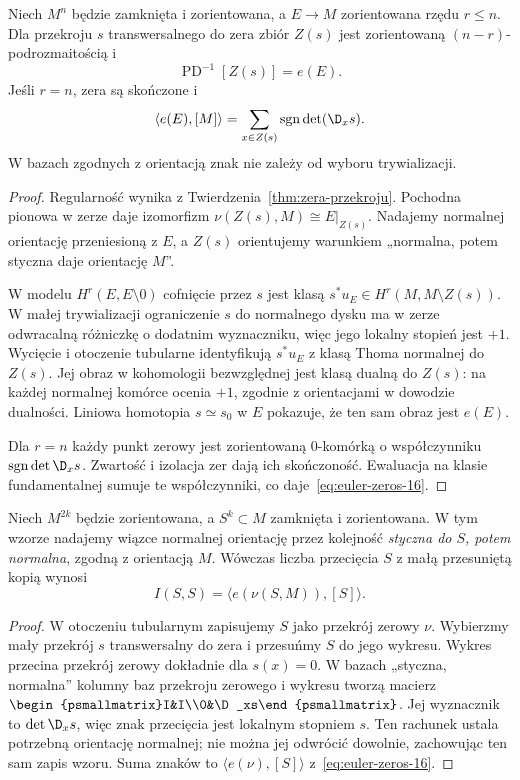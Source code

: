 \begin{twierdzenie}
\label{thm:euler-zeros-16}
Niech $M^n$ będzie
zamknięta i zorientowana,
a $E\to M$ zorientowana
rzędu $r\leq n$.
Dla przekroju $s$
transwersalnego do zera
zbiór $Z(s)$ jest
zorientowaną
$(n-r)$-podrozmaitością i
\[
 \operatorname{PD}^{-1}[Z(s)]=e(E).
\]
Jeśli $r=n$, zera są
skończone i
\begin{equation}\label{eq:euler-zeros-16}
 \langle e(E),[M]\rangle
   =\sum_{x\in Z(s)}
       \operatorname{sgn}\det(\D_xs).
\end{equation}
W bazach zgodnych z
orientacją znak nie
zależy od wyboru
trywializacji.
\end{twierdzenie}
\begin{proof}
Regularność wynika z Twierdzenia~\ref{thm:zera-przekroju}.
Pochodna pionowa w zerze daje izomorfizm
$\nu(Z(s),M)\cong E|_{Z(s)}$. Nadajemy normalnej
orientację przeniesioną z $E$, a $Z(s)$ orientujemy
warunkiem „normalna, potem styczna daje orientację $M$”.

W modelu $H^r(E,E\setminus0)$ cofnięcie przez $s$
jest klasą $s^*u_E\in H^r(M,M\setminus Z(s))$.
W małej trywializacji ograniczenie $s$ do normalnego
dysku ma w zerze odwracalną różniczkę o dodatnim
wyznaczniku, więc jego lokalny stopień jest $+1$.
Wycięcie i otoczenie tubularne identyfikują
$s^*u_E$ z klasą Thoma normalnej do $Z(s)$.
Jej obraz w kohomologii bezwzględnej jest klasą
dualną do $Z(s)$: na każdej normalnej komórce
ocenia $+1$, zgodnie z orientacjami w dowodzie dualności.
Liniowa homotopia $s\simeq s_0$ w $E$ pokazuje,
że ten sam obraz jest $e(E)$.

Dla $r=n$ każdy punkt zerowy jest zorientowaną
$0$-komórką o współczynniku
$\operatorname{sgn}\det\D_xs$. Zwartość i izolacja
zer dają ich skończoność. Ewaluacja na klasie
fundamentalnej sumuje te współczynniki,
co daje~\eqref{eq:euler-zeros-16}.
\end{proof}

\begin{wniosek}[Samoprzecięcie]
\label{cor:samoprzeciecie-16}
Niech $M^{2k}$ będzie zorientowana, a
$S^k\subset M$ zamknięta i zorientowana.
W tym wzorze nadajemy wiązce normalnej orientację
przez kolejność \emph{styczna do $S$, potem normalna},
zgodną z orientacją $M$. Wówczas
liczba przecięcia
$S$ z małą przesuniętą
kopią wynosi
\[
 I(S,S)=\langle e(\nu(S,M)),[S]\rangle.
\]
\end{wniosek}
\begin{proof}
W otoczeniu tubularnym
zapisujemy $S$ jako
przekrój zerowy $\nu$.
Wybierzmy mały przekrój
$s$ transwersalny do
zera i przesuńmy $S$
do jego wykresu.
Wykres przecina
przekrój zerowy
dokładnie dla $s(x)=0$.
W bazach „styczna, normalna” kolumny baz
przekroju zerowego i wykresu tworzą macierz
$\begin{psmallmatrix}I&I\\0&\D_xs\end{psmallmatrix}$.
Jej wyznacznik to $\det\D_xs$, więc znak przecięcia
jest lokalnym stopniem $s$. Ten rachunek ustala
potrzebną orientację normalnej; nie można jej
odwrócić dowolnie, zachowując ten sam zapis wzoru.
Suma znaków to
$\langle e(\nu),[S]\rangle$
z~\eqref{eq:euler-zeros-16}.
\end{proof}

